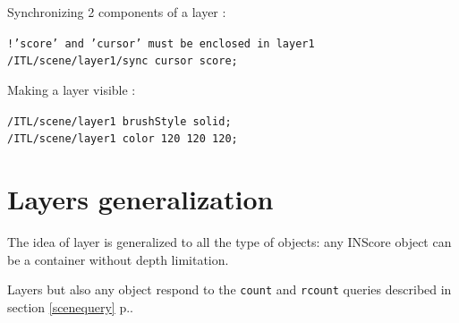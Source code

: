 \documentclass[a4paper,twoside]{report}
\newcommand{\sublevel}[1]	{\section{#1}}
\newcommand{\fullref}[1]	{\ref{#1} p.\pageref{#1}}
\newcommand{\OSC}[1]		{\texttt{#1}}
\newcommand{\sample}	[1]			{\vspace{-2mm}\begin{center}\colorbox{mygrey}{
								\begin{minipage}[t]{0.9\columnwidth} 
								{\small \texttt{#1}}
								\end{minipage}}\end{center}}
\begin{document}
Synchronizing 2 components of a layer :
\sample{!'score' and 'cursor' must be enclosed in layer1 \\
/ITL/scene/layer1/sync cursor score; 
}

Making a layer visible :
\sample{/ITL/scene/layer1 brushStyle solid; \\
/ITL/scene/layer1 color 120 120 120; 
}

\sublevel{Layers generalization}
\label{layersgen}

The idea of layer is generalized to all the type of objects: any INScore object can be a container without depth limitation. 

Layers but also any object respond to the \OSC{count} and \OSC{rcount} queries described in section \fullref{scenequery}.



%





%
%

\end{document}
